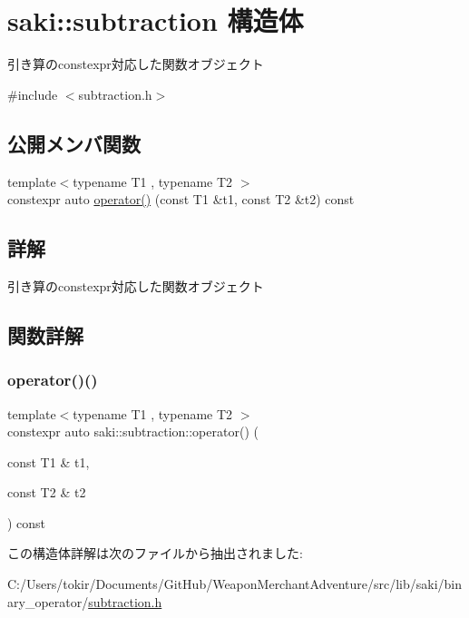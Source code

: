 \hypertarget{structsaki_1_1subtraction}{}\section{saki\+:\+:subtraction 構造体}
\label{structsaki_1_1subtraction}


引き算のconstexpr対応した関数オブジェクト  




{\ttfamily \#include $<$subtraction.\+h$>$}

\subsection*{公開メンバ関数}
\begin{DoxyCompactItemize}
\item 
{\footnotesize template$<$typename T1 , typename T2 $>$ }\\constexpr auto \mbox{\hyperlink{structsaki_1_1subtraction_a6c26b497569ef8b5fd7aa213ca675a2c}{operator()}} (const T1 \&t1, const T2 \&t2) const
\end{DoxyCompactItemize}


\subsection{詳解}
引き算のconstexpr対応した関数オブジェクト 

\subsection{関数詳解}
\mbox{\label{structsaki_1_1subtraction_a6c26b497569ef8b5fd7aa213ca675a2c}} 
\subsubsection{\texorpdfstring{operator()()}{operator()()}}
{\footnotesize\ttfamily template$<$typename T1 , typename T2 $>$ \\
constexpr auto saki\+::subtraction\+::operator() (\begin{DoxyParamCaption}\item[{const T1 \&}]{t1,  }\item[{const T2 \&}]{t2 }\end{DoxyParamCaption}) const\hspace{0.3cm}{\ttfamily [inline]}}



この構造体詳解は次のファイルから抽出されました\+:\begin{DoxyCompactItemize}
\item 
C\+:/\+Users/tokir/\+Documents/\+Git\+Hub/\+Weapon\+Merchant\+Adventure/src/lib/saki/binary\+\_\+operator/\mbox{\hyperlink{subtraction_8h}{subtraction.\+h}}\end{DoxyCompactItemize}
